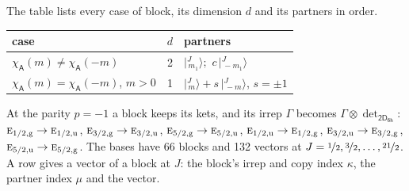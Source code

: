 \documentclass[10pt,a4paper]{article}
\numberwithin{equation}{section}
\newcommand{\grp}[1]{\mathsf{#1}}
\newcommand{\irr}[1]{\text{\normalfont\scshape #1}}
\newcommand{\ptag}[1]{\mathrm{#1}}
\newcommand{\chiA}{\chi_{\grp{A}}}
\newcommand{\irrprod}{\otimes}
\newcommand{\mult}{\kappa}
\newcommand{\intx}{\mu}
\newcommand{\jm}[2]{\bigl\lvert{}^{#1}_{\,#2}\bigr\rangle}
\begin{document}
\leavevmode\label{n:head.case}\label{n:head.partners}The table lists every case of block, its dimension $d$ and its partners in order.
\begin{center}\begin{tabular}{@{}lrl@{}}\toprule
case & $d$ & partners\\\midrule
$\chiA(m) \ne \chiA(-m)$ & 2 & $\jm{J}{m_1}$;\ $c\,\jm{J}{-m_1}$\\
$\chiA(m) = \chiA(-m)$, $m > 0$ & 1 & $\jm{J}{m} + s\,\jm{J}{-m}$, $s = \pm1$\\
\bottomrule\end{tabular}\end{center}
At the parity $p = -1$ a block keeps its kets, and its irrep $\Gamma$ becomes $\Gamma \irrprod \det_{\grp{2D_{6h}}}$: $\irr{e}_{1/2,\ptag{g}} \to \irr{e}_{1/2,\ptag{u}}$, $\irr{e}_{3/2,\ptag{g}} \to \irr{e}_{3/2,\ptag{u}}$, $\irr{e}_{5/2,\ptag{g}} \to \irr{e}_{5/2,\ptag{u}}$, $\irr{e}_{1/2,\ptag{u}} \to \irr{e}_{1/2,\ptag{g}}$, $\irr{e}_{3/2,\ptag{u}} \to \irr{e}_{3/2,\ptag{g}}$, $\irr{e}_{5/2,\ptag{u}} \to \irr{e}_{5/2,\ptag{g}}$.
The bases have 66 blocks and 132 vectors at $J = \nicefrac{1}{2}, \nicefrac{3}{2}, \dots, \nicefrac{21}{2}$. \label{n:head.vector}A row gives a vector of a block at $J$: the block's irrep and copy index $\mult$, the partner index $\intx$ and the vector.
\end{document}
